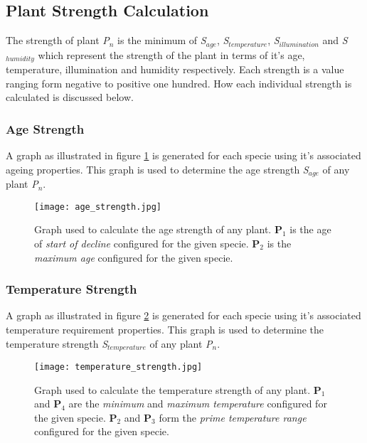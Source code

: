 \subsection{Plant Strength Calculation}

The strength of plant \textit{P$_{n}$} is the minimum of \textit{S$_{age}$}, \textit{S$_{temperature}$}, \textit{S$_{illumination}$} and \textit{S$_{humidity}$} which represent the strength of the plant in terms of it's age, temperature, illumination and humidity respectively. Each strength is a value ranging form negative to positive one hundred. How each individual strength is calculated is discussed below.

\subsubsection{Age Strength}

A graph as illustrated in figure \ref{fig:strength_calc_age} is generated for each specie using it's associated ageing properties. This graph is used to determine the age strength \textit{S$_{age}$} of any plant \textit{P$_{n}$}.

\begin{figure}
\center
	\texttt{[image: age\_strength.jpg]}
	\caption{ Graph used to calculate the age strength of any plant. \textbf{P$_{1}$} is the age of \textit{start of decline} configured for the given specie. \textbf{P$_{2}$} is the \textit{maximum age} configured for the given specie. }	
	\label{fig:strength_calc_age}
\end{figure}

\subsubsection{Temperature Strength}

A graph as illustrated in figure \ref{fig:strength_calc_temp} is generated for each specie using it's associated temperature requirement properties. This graph is used to determine the temperature strength \textit{S$_{temperature}$} of any plant \textit{P$_{n}$}.

\begin{figure}
\center
	\texttt{[image: temperature\_strength.jpg]}
	\caption{ Graph used to calculate the temperature strength of any plant. \textbf{P$_{1}$} and \textbf{P$_{4}$} are the \textit{minimum} and \textit{maximum temperature} configured for the given specie. \textbf{P$_{2}$} and \textbf{P$_{3}$} form the \textit{prime temperature range} configured for the given specie.  }	
	\label{fig:strength_calc_temp}
\end{figure}

